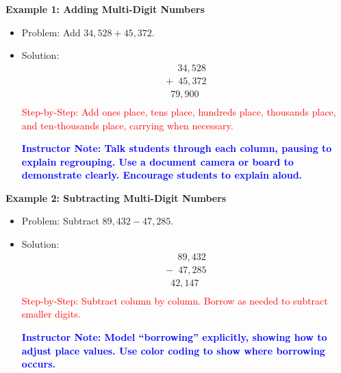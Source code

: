 \documentclass[27.11148pt]{article}
\newcommand{\solution}[1]{\textcolor{red}{#1}}
\newcommand{\note}[1]{\textcolor{blue}{\textbf{Instructor Note: #1}}}
\begin{document}
\begin{tcolorbox}[colframe=black!60, colback=white, 
coltitle=black, colbacktitle=black!15, fonttitle=\bfseries\Large, 
title=Examples, halign title=center, left=10pt, right=10pt, top=10pt, bottom=15pt]
\textbf{Example 1: Adding Multi-Digit Numbers}
\begin{itemize}
    \item Problem: Add \( 34,528 + 45,372 \).
    \item Solution:
    \[
    \begin{array}{r}
       \phantom{+} 34,528 \\
    + \phantom{4}45,372 \\
    \hline
       \phantom{4}79,900 \\
    \end{array}
    \]
    \solution{Step-by-Step: Add ones place, tens place, hundreds place, thousands place, and ten-thousands place, carrying when necessary.}

    \note{Talk students through each column, pausing to explain regrouping. Use a document camera or board to demonstrate clearly. Encourage students to explain aloud.}
\end{itemize}

\textbf{Example 2: Subtracting Multi-Digit Numbers}
\begin{itemize}
    \item Problem: Subtract \( 89,432 - 47,285 \).
    \item Solution:
    \[
    \begin{array}{r}
       \phantom{+} 89,432 \\
    - \phantom{4}47,285 \\
    \hline
       \phantom{4}42,147 \\
    \end{array}
    \]
    \solution{Step-by-Step: Subtract column by column. Borrow as needed to subtract smaller digits.}

    \note{Model “borrowing” explicitly, showing how to adjust place values. Use color coding to show where borrowing occurs.}
\end{itemize}
\end{tcolorbox}
\end{document}
